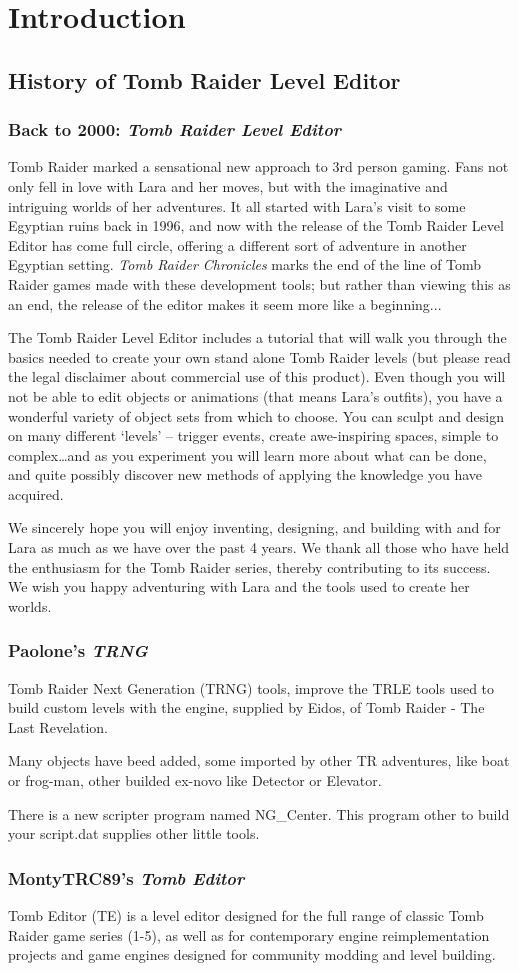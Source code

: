 \part{Introduction}
\chapter{History of Tomb Raider Level Editor}
\section{Back to 2000: \emph{Tomb Raider Level Editor}}
Tomb Raider marked a sensational new approach to 3rd person gaming. Fans not only fell in love with Lara and her moves, but with the imaginative and intriguing worlds of her adventures. It all started with Lara's visit to some Egyptian ruins back in 1996, and now with the release of the Tomb Raider Level Editor has come full circle, offering a different sort of adventure in another Egyptian setting. \emph{Tomb Raider Chronicles} marks the end of the line of Tomb Raider games made with these development tools; but rather than viewing this as an end, the release of the editor makes it seem more like a beginning...
\par The Tomb Raider Level Editor includes a tutorial that will walk you through the basics needed to create your own stand alone Tomb Raider levels (but please read the legal disclaimer about commercial use of this product). Even though you will not be able to edit objects or animations (that means Lara’s outfits), you have a wonderful variety of object sets from which to choose. You can sculpt and design on many different ‘levels’ – trigger events, create awe-inspiring spaces, simple to complex…and as you experiment you will learn more about what can be done, and quite possibly discover new methods of applying the knowledge you have acquired.
\par We sincerely hope you will enjoy inventing, designing, and building with and for Lara as much as we have over the past 4 years. We thank all those who have held the enthusiasm for the Tomb Raider series, thereby contributing to its success. We wish you happy adventuring with Lara and the tools used to create her worlds.
\cite{trle_manual}
\section{Paolone's \emph{TRNG}}
Tomb Raider Next Generation (TRNG) tools, improve the TRLE tools used to build custom levels with the engine, supplied by Eidos, of Tomb Raider - The Last Revelation.
\par Many objects have beed added, some imported by other TR adventures, like boat or frog-man, other builded ex-novo like Detector or Elevator.
\par There is a new scripter program named NG\_Center. This program other to build your script.dat supplies other little tools. \cite{paolone_trng}
\section{MontyTRC89's \emph{Tomb Editor}}
Tomb Editor (TE) is a level editor designed for the full range of classic Tomb Raider game series (1-5), as well as for contemporary engine reimplementation projects and game engines designed for community modding and level building. \cite{TE_github}